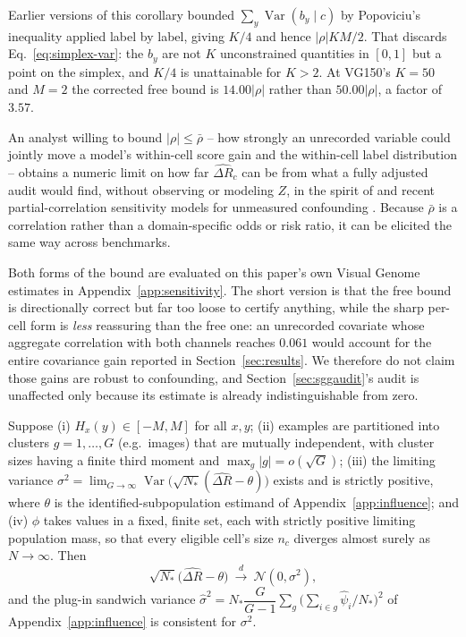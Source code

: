Earlier versions of this corollary bounded $\sum_y\operatorname{Var}(b_y\mid c)$ by
Popoviciu's inequality applied label by label, giving $K/4$ and hence $|\rho|KM/2$. That
discards Eq.~\eqref{eq:simplex-var}: the $b_y$ are not $K$ unconstrained quantities in
$[0,1]$ but a point on the simplex, and $K/4$ is unattainable for $K>2$. At VG150's
$K=50$ and $M=2$ the corrected free bound is $14.00|\rho|$ rather than $50.00|\rho|$, a
factor of $3.57$.

An analyst willing to bound $|\rho|\le\bar\rho$ -- how strongly an unrecorded variable
could jointly move a model's within-cell score gain and the within-cell label
distribution -- obtains a numeric limit on how far $\widehat{\Delta R}_c$ can be from
what a fully adjusted audit would find, without observing or modeling $Z$, in the spirit
of \citet{rosenbaum2002observational} and recent partial-correlation sensitivity models
for unmeasured confounding \citep{cinelli2020making}.
Because $\bar\rho$ is a correlation rather than a domain-specific odds or risk ratio, it
can be elicited the same way across benchmarks.

Both forms of the bound are evaluated on this paper's own Visual Genome estimates in
Appendix~\ref{app:sensitivity}. The short version is that the free bound is directionally
correct but far too loose to certify anything, while the sharp per-cell form is
\emph{less} reassuring than the free one: an unrecorded covariate whose aggregate
correlation with both channels reaches $0.061$ would account for the entire covariance gain
reported in Section~\ref{sec:results}. We therefore do not claim those gains are robust to
confounding, and Section~\ref{sec:sggaudit}'s audit is unaffected only because its estimate
is already indistinguishable from zero.

\begin{theorem}\label{thm:clt}
Suppose (i) $H_x(y)\in[-M,M]$ for all $x,y$; (ii) examples are partitioned into clusters
$g=1,\dots,G$ (e.g.\ images) that are mutually independent, with cluster sizes having a
finite third moment and $\max_g|g|=o(\sqrt{G})$; (iii) the limiting variance
$\sigma^2=\lim_{G\to\infty}\operatorname{Var}\!\bigl(\sqrt{N_*}(\widehat{\Delta R}-\theta)\bigr)$
exists and is strictly positive, where $\theta$ is the identified-subpopulation estimand
of Appendix~\ref{app:influence}; and (iv) $\phi$ takes values in a fixed, finite set,
each with strictly positive limiting population mass, so that every eligible cell's size
$n_c$ diverges almost surely as $N\to\infty$. Then
\begin{equation}
\sqrt{N_*}\bigl(\widehat{\Delta R}-\theta\bigr)\ \xrightarrow{d}\ \mathcal N(0,\sigma^2),
\end{equation}
and the plug-in sandwich variance $\widehat\sigma^2=N_*\dfrac{G}{G-1}\sum_{g}\bigl(\sum_{i\in g}\widehat\psi_i/N_*\bigr)^2$
of Appendix~\ref{app:influence} is consistent for $\sigma^2$.
\end{theorem}

